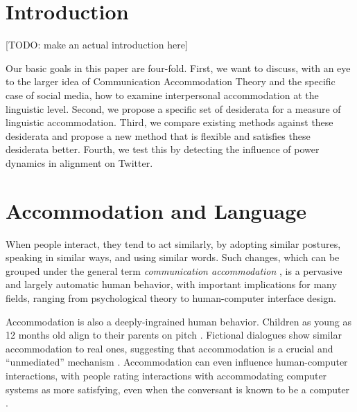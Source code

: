 \documentclass{acm_proc_article-sp}
\begin{document}



\section{Introduction}
[TODO: make an actual introduction here]

Our basic goals in this paper are four-fold. First, we want to discuss, with an eye to the larger idea of Communication Accommodation Theory and the specific case of social media, how to examine interpersonal accommodation at the linguistic level.  Second, we propose a specific set of desiderata for a measure of linguistic accommodation. Third, we compare existing methods against these desiderata and propose a new method that is flexible and satisfies these desiderata better. Fourth, we test this by detecting the influence of power dynamics in alignment on Twitter.

\section{Accommodation and Language}
When people interact, they tend to act similarly, by adopting similar postures, speaking in similar ways, and using similar words. Such changes, which can be grouped under the general term \textit{communication accommodation} \cite{GilesCouplandCoupland1991}, is a pervasive and largely automatic human behavior, with important implications for many fields, ranging from psychological theory to human-computer interface design.

Accommodation is also a deeply-ingrained human behavior.  Children as young as 12 months old align to their parents on pitch \cite{Lieberman1967}.  Fictional dialogues show similar accommodation to real ones, suggesting that accommodation is a crucial and ``unmediated'' mechanism \cite{PickeringGarrod2004,DNMLee2011}.  Accommodation can even influence human-computer interactions, with people rating interactions with accommodating computer systems as more satisfying, even when the conversant is known to be a computer \cite{NassLee2000,vanBaarenEtAl2003,BraniganEtAl2010}.
\end{document}
